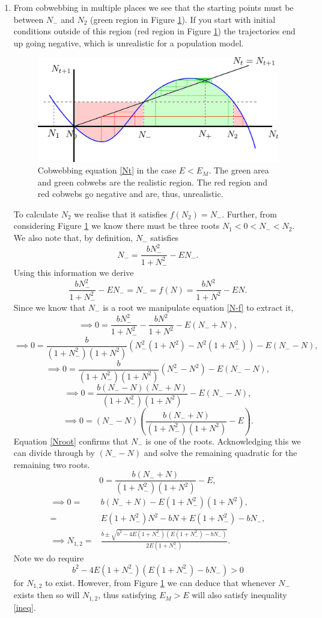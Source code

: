 \documentclass[10pt]{article}
\newcommand{\bb}{\begin{equation}}
\newcommand{\ee}{\end{equation}}
\newcommand{\fig}[1]{Figure \ref{#1}}
\newcommand{\eqn}[1]{equation \eqref{#1}}
\newcommand{\tp}{.8\textwidth}
\renewcommand{\l}{\left(}
\renewcommand{\r}{\right)}
\begin{document}
\begin{Answ}
\begin{enumerate}
\item From cobwebbing in multiple places we see that the starting points must be between $N_-$ and $N_2$ (green region in \fig{Cobwebbing}). If you start with initial conditions outside of this region (red region in \fig{Cobwebbing}) the trajectories end up going negative, which is unrealistic for a population model.
\begin{figure}[h!!!tb]
\centering
\includegraphics[width=\tp]{../../Pictures/Cobwebbing.png}
\caption{\label{Cobwebbing} Cobwebbing \eqn{Nt} in the case $E<E_M$. The green area and green cobwebs are the realistic region. The red region and red cobwebs go negative and are, thus, unrealistic. }
\end{figure}

To calculate $N_2$ we realise that it satisfies $f(N_2)=N_-$. Further, from considering \fig{Cobwebbing} we know there must be three roots $N_1<0<N_-<N_2$. We also note that, by definition, $N_-$ satisfies
\bb
N_-=\frac{bN_-^2}{1+N_-^2}-EN_-.
\ee
Using this information we derive
\bb
\frac{bN_-^2}{1+N_-^2}-EN_-=N_-=f(N)=\frac{bN^2}{1+N^2}-EN\label{N-f}.
\ee
Since we know that $N_-$ is a root we manipulate \eqn{N-f} to extract it,
\bb
\implies 0=\frac{bN_-^2}{1+N_-^2}-\frac{bN^2}{1+N^2}-E(N_-+N),\nonumber
\ee
\bb
\implies0=\frac{b}{\l 1+N_-^2\r\l 1+N^2\r}\l N_-^2\l 1+N^2\r-N^2\l 1+N_-^2\r\r-E(N_--N),\nonumber
\ee
\bb
\implies0=\frac{b}{\l 1+N_-^2\r\l 1+N^2\r}\l N_-^2-N^2\r-E(N_--N),\nonumber
\ee
\bb
\implies0=\frac{b(N_--N)(N_-+N)}{\l 1+N_-^2\r\l 1+N^2\r}-E(N_--N),\nonumber
\ee
\bb
\implies0=(N_--N)\l\frac{b(N_-+N)}{\l 1+N_-^2\r\l 1+N^2\r}-E\r.\label{Nroot}
\ee
Equation \eqref{Nroot} confirms that $N_-$ is one of the roots. Acknowledging this we can divide through by $(N_--N)$ and solve the remaining quadratic for the remaining two roots.
\bb
0=\frac{b(N_-+N)}{\l 1+N_-^2\r\l 1+N^2\r}-E,\nonumber
\ee
\begin{align}
\implies 0=&b(N_-+N)-E\l 1+N_-^2\r\l 1+N^2\r,\nonumber\\
=&E\l 1+N_-^2\r N^2-bN+E\l 1+N_-^2\r-bN_-,\nonumber\\
\implies N_{1,2}=&\frac{b\pm\sqrt{b^2-4E(1+N_-^2)\l E\l 1+N_-^2\r-bN_-\r}}{2E(1+N_-^2)}.\nonumber
\end{align}
Note we do require
\bb
b^2-4E(1+N_-^2)\l E\l 1+N_-^2\r-bN_-\r>0\label{ineq}
\ee
for $N_{1,2}$ to exist. However, from \fig{Cobwebbing} we can deduce that whenever $N_-$ exists then so will $N_{1,2}$, thus satisfying $E_M>E$ will also satisfy inequality \eqref{ineq}.


\end{enumerate}
\end{Answ}
\end{document}

